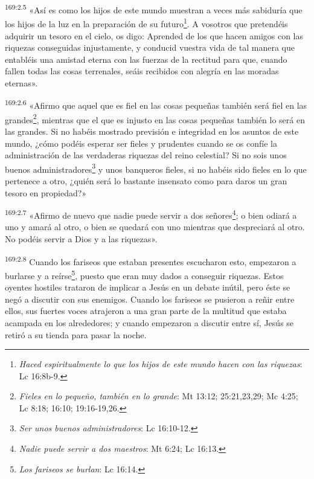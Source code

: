 \par 
\textsuperscript{169:2.5} «Así es como los hijos de este mundo muestran a veces más sabiduría que los hijos de la luz en la preparación de su futuro\footnote{\textit{Haced espiritualmente lo que los hijos de este mundo hacen con las riquezas}: Lc 16:8b-9.}. A vosotros que pretendéis adquirir un tesoro en el cielo, os digo: Aprended de los que hacen amigos con las riquezas conseguidas injustamente, y conducid vuestra vida de tal manera que entabléis una amistad eterna con las fuerzas de la rectitud para que, cuando fallen todas las cosas terrenales, seáis recibidos con alegría en las moradas eternas».

\par 
\textsuperscript{169:2.6} «Afirmo que aquel que es fiel en las cosas pequeñas también será fiel en las grandes\footnote{\textit{Fieles en lo pequeño, también en lo grande}: Mt 13:12; 25:21,23,29; Mc 4:25; Lc 8:18; 16:10; 19:16-19,26.}, mientras que el que es injusto en las cosas pequeñas también lo será en las grandes. Si no habéis mostrado previsión e integridad en los asuntos de este mundo, ¿cómo podéis esperar ser fieles y prudentes cuando se os confíe la administración de las verdaderas riquezas del reino celestial? Si no sois unos buenos administradores\footnote{\textit{Ser unos buenos administradores}: Lc 16:10-12.} y unos banqueros fieles, si no habéis sido fieles en lo que pertenece a otro, ¿quién será lo bastante insensato como para daros un gran tesoro en propiedad?»

\par 
\textsuperscript{169:2.7} «Afirmo de nuevo que nadie puede servir a dos señores\footnote{\textit{Nadie puede servir a dos maestros}: Mt 6:24; Lc 16:13.}; o bien odiará a uno y amará al otro, o bien se quedará con uno mientras que despreciará al otro. No podéis servir a Dios y a las riquezas».

\par 
\textsuperscript{169:2.8} Cuando los fariseos que estaban presentes escucharon esto, empezaron a burlarse y a reírse\footnote{\textit{Los fariseos se burlan}: Lc 16:14.}, puesto que eran muy dados a conseguir riquezas. Estos oyentes hostiles trataron de implicar a Jesús en un debate inútil, pero éste se negó a discutir con sus enemigos. Cuando los fariseos se pusieron a reñir entre ellos, sus fuertes voces atrajeron a una gran parte de la multitud que estaba acampada en los alrededores; y cuando empezaron a discutir entre sí, Jesús se retiró a su tienda para pasar la noche.

